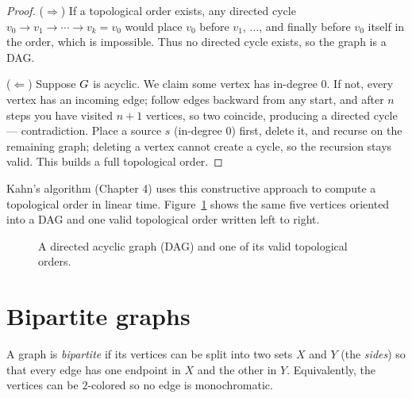 \begin{proof}
($\Rightarrow$) If a topological order exists, any directed cycle
$v_0 \to v_1 \to \cdots \to v_k = v_0$ would place $v_0$ before $v_1$, $\dots$,
and finally before $v_0$ itself in the order, which is impossible. Thus no
directed cycle exists, so the graph is a DAG.

($\Leftarrow$) Suppose $G$ is acyclic. We claim some vertex has in-degree
$0$. If not, every vertex has an incoming edge; follow edges backward from any
start, and after $n$ steps you have visited $n+1$ vertices, so two coincide,
producing a directed cycle --- contradiction. Place a source $s$ (in-degree $0$)
first, delete it, and recurse on the remaining graph; deleting a vertex cannot
create a cycle, so the recursion stays valid. This builds a full topological
order.
\end{proof}

Kahn's algorithm (Chapter 4) uses this constructive approach to compute a topological order in linear time. Figure~\ref{fig:ch01-five-vertex-dag} shows the same five
vertices oriented into a DAG and one valid topological order written left to
right.

\begin{figure}[htbp]
\centering
{}
\caption{A directed acyclic graph (DAG) and one of its valid topological orders.}
\label{fig:ch01-five-vertex-dag}
\end{figure}

\section{Bipartite graphs}
\label{ch01:bipartite}

\begin{definition}[Bipartite]
\label{ch01:def-bipartite}
A graph is \emph{bipartite} if its vertices can be split into two sets $X$ and
$Y$ (the \emph{sides}) so that every edge has one endpoint in $X$ and the other
in $Y$. Equivalently, the vertices can be $2$-colored so no edge is
monochromatic.
\end{definition}

